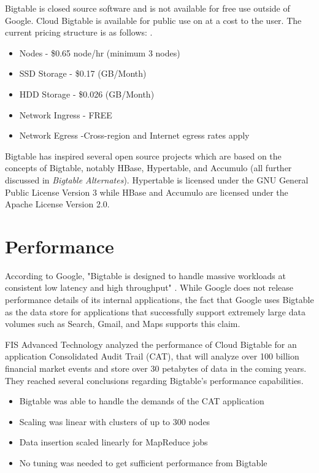 \documentclass[9pt,twocolumn,twoside]{styles/osajnl}
\begin{document}
Bigtable is closed source software and is not available for free use outside of Google. Cloud Bigtable is available for public use on at a cost to the user. The current pricing structure is as follows: \cite{www-cloudbigtable}.

\vspace{-\topsep}
\begin{itemize}
\item Nodes - \$0.65 node/hr (minimum 3 nodes) 
\item SSD Storage -  \$0.17 (GB/Month)  
\item HDD Storage - \$0.026 (GB/Month) 
\item Network Ingress - FREE 
\item Network Egress -Cross-region and Internet egress rates apply  
\end{itemize}
\vspace{-\topsep}


Bigtable has inspired several open source projects which are based on the concepts of Bigtable, notably HBase, Hypertable, and Accumulo (all further discussed in \emph{Bigtable Alternates}). Hypertable is licensed under the GNU General Public License Version 3 while HBase and Accumulo are licensed under the Apache License Version 2.0.


\section{Performance}

According to Google, "Bigtable is designed to handle massive workloads at consistent low latency and high throughput" \cite{www-cloudbigtable}.  While Google does not release performance details of its internal applications, the fact that Google uses Bigtable as the data store for applications that successfully support extremely large data volumes such as Search, Gmail, and Maps supports this claim.

FIS Advanced Technology analyzed the performance of Cloud Bigtable for an application Consolidated Audit Trail (CAT), that will analyze over 100 billion financial market events and store over 30 petabytes of data in the coming years.  They reached several conclusions regarding Bigtable's performance capabilities.
\vspace{-\topsep}
\begin{itemize}
\item Bigtable was able to handle the demands of the CAT application 
\item Scaling was linear with clusters of up to 300 nodes 
\item Data insertion scaled linearly for MapReduce jobs 
\item No tuning was needed to get sufficient performance from Bigtable
\end{itemize}
\vspace{-\topsep}
\end{document}
